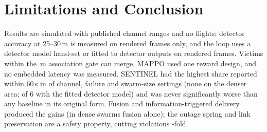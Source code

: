 \documentclass{IOS-Book-Article}
\newif\ifhighlight
\newenvironment{revised}{\ifhighlight\color{blue}\fi}{}
\newcommand{\kept}[1]{{\color{black}#1}}
\begin{document}
\section{Limitations and \kept{Conclusion}}
\begin{revised}
Results are simulated with published channel ranges and no flights; detector accuracy at 25--30\,m is
measured on rendered frames only, and the loop uses a detector model hand-set or fitted to detector
outputs on rendered frames. Victims within the \nGate\,m association gate
can merge, MAPPO used one reward design, and no embedded latency was measured. SENTINEL had the highest
share reported within 60\,s in \nTopN{} of \nTopTotal{} channel, failure and swarm-size settings (none on
the denser area; \nRobNtop{} of 6 with the fitted detector model) and was never significantly worse than
any baseline in its original form. Fusion and information-triggered delivery produced the gains (in dense swarms fusion
alone); the outage spring and link preservation are a safety property, cutting violations
\nViolFold-fold.
\end{revised}



\end{document}
